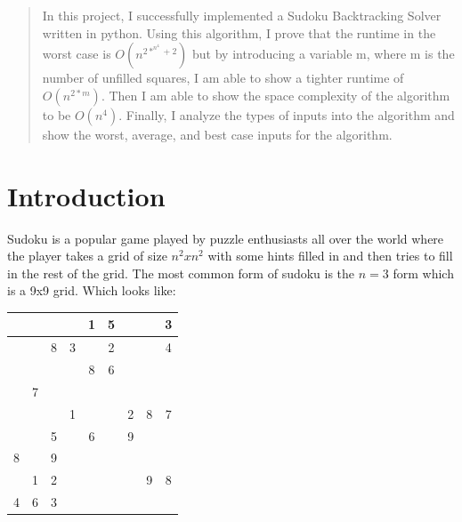 \documentclass{sig-alternate}
\begin{document}
\maketitle
\begin{abstract}
In this project, I successfully implemented a Sudoku Backtracking Solver written in python. Using this algorithm, I prove that the runtime in the worst case is $O(n^{2*^{n^4} + 2})$ but by introducing a variable m, where m is the number of unfilled squares, I am able to show a tighter runtime of $O(n^{2*m})$. Then I am able to show the space complexity of the algorithm to be $O(n^4)$. Finally, I analyze the types of inputs into the algorithm and show the worst, average, and best case inputs for the algorithm. 
\end{abstract}




\section{Introduction}
Sudoku is a popular game played by puzzle enthusiasts all over the world where the player takes 
a grid of size $n^2 x n^2$ with some hints filled in and then tries to fill in the rest of the grid. \cite{YasSS} The most common form of sudoku is the $n=3$ form which is a 9x9 grid. Which looks like: 

\begin{center}
  \begin{tabular}{ | c | c | c | c | c | c | c | c | c |}
    \hline
     & & & & 1 & 5 & & & 3 \\ \hline
	 & & 8 & 3 & & 2 & & & 4 \\ \hline
	 & & & & 8 & 6 & & & \\ \hline
	 & 7 & & & & & & & \\ \hline
	 & & & 1 & & & 2 & 8 & 7\\ \hline
	 & & 5 & & 6 & & 9 & & \\ \hline
     8 & & 9 & & & & & & \\ \hline
	 & 1 & 2 & & & & & 9 & 8\\ \hline
	 4 & 6 & 3 & & & & & & \\ \hline
  \end{tabular}
\end{center}
\end{document}
